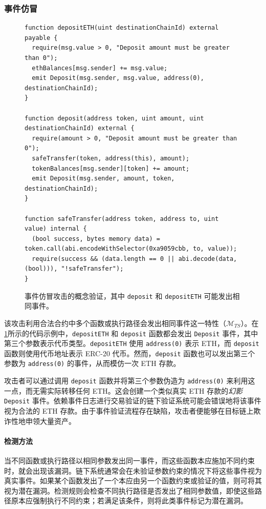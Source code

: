 \subsubsection{事件仿冒}\label{vec:attack1}

\begin{figure}
\small
\footnotesize
\begin{lstlisting}[language=Solidity]
function depositETH(uint destinationChainId) external payable {
  require(msg.value > 0, "Deposit amount must be greater than 0");
  ethBalances[msg.sender] += msg.value;
  emit Deposit(msg.sender, msg.value, address(0), destinationChainId);
}

function deposit(address token, uint amount, uint destinationChainId) external {
  require(amount > 0, "Deposit amount must be greater than 0");
  safeTransfer(token, address(this), amount);
  tokenBalances[msg.sender][token] += amount;
  emit Deposit(msg.sender, amount, token, destinationChainId);
}

function safeTransfer(address token, address to, uint value) internal {
  (bool success, bytes memory data) = token.call(abi.encodeWithSelector(0xa9059cbb, to, value));
  require(success && (data.length == 0 || abi.decode(data, (bool))), "!safeTransfer");
}
\end{lstlisting}
\caption{事件仿冒攻击的概念验证，其中 \texttt{deposit} 和
\texttt{depositETH} 可能发出相同事件。}\label{code:1}
\end{figure}

该攻击利用合法合约中多个函数或执行路径会发出相同事件这一特性（\(\bm{\mathcal{M}}_{TS}\)）。在\cref{code:1}所示的代码示例中，\texttt{depositETH} 和 \texttt{deposit} 函数都会发出 \texttt{Deposit} 事件，其中第三个参数表示代币类型。\texttt{depositETH} 使用 \texttt{address(0)} 表示 ETH，而 \texttt{deposit} 函数则使用代币地址表示 ERC-20 代币。然而，\texttt{deposit} 函数也可以发出第三个参数为 \texttt{address(0)} 的事件，从而模仿一次 ETH 存款。

攻击者可以通过调用 \texttt{deposit} 函数并将第三个参数伪造为 \texttt{address(0)} 来利用这一点，而无需实际转移任何 ETH。这会创建一个类似真实 ETH 存款的\emph{幻影} \texttt{Deposit} 事件。依赖事件日志进行交易验证的链下验证系统可能会错误地将该事件视为合法的 ETH 存款。由于事件验证流程存在缺陷，攻击者便能够在目标链上欺诈性地申领大量资产。


\paragraph{检测方法}
当不同函数或执行路径以相同参数发出同一事件，而这些函数本应施加不同约束时，就会出现该漏洞。链下系统通常会在未验证参数约束的情况下将这些事件视为真实事件。如果某个函数发出了一个本应由另一个函数约束或验证的值，则可将其视为潜在漏洞。检测规则会检查不同执行路径是否发出了相同参数值，即使这些路径原本应强制执行不同约束；若满足该条件，则将此类事件标记为潜在漏洞。



